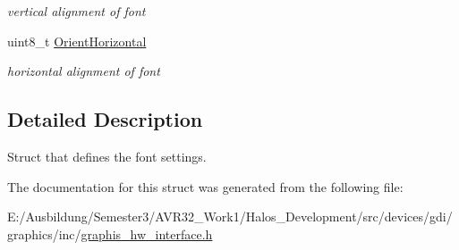 \begin{CompactItemize}
\begin{CompactList}\small\item\em vertical alignment of font \item\end{CompactList}\item 
\hypertarget{struct_font_settings__t_79117bfe6b12b78a914e6cf89aaf0ea5}{
uint8\_\-t \hyperlink{struct_font_settings__t_79117bfe6b12b78a914e6cf89aaf0ea5}{OrientHorizontal}}
\label{struct_font_settings__t_79117bfe6b12b78a914e6cf89aaf0ea5}

\begin{CompactList}\small\item\em horizontal alignment of font \item\end{CompactList}\end{CompactItemize}


\subsection{Detailed Description}
Struct that defines the font settings. 

The documentation for this struct was generated from the following file:\begin{CompactItemize}
\item 
E:/Ausbildung/Semester3/AVR32\_\-Work1/Halos\_\-Development/src/devices/gdi/graphics/inc/\hyperlink{graphis__hw__interface_8h}{graphis\_\-hw\_\-interface.h}\end{CompactItemize}
